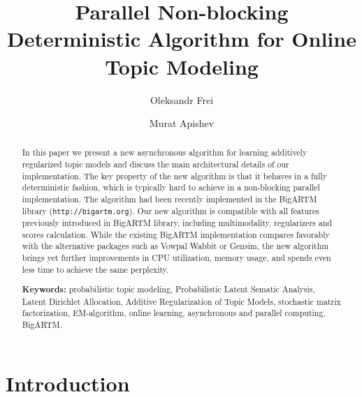 \documentclass[russian,english]{llncs}
\begin{document}
\title{
    Parallel Non-blocking Deterministic Algorithm for Online Topic Modeling
}
\author{
    Oleksandr Frei
    \and
    Murat Apishev
}

\maketitle

\begin{abstract}
In this paper we present a new asynchronous algorithm for learning additively regularized topic models
and discuss the main architectural details of our implementation.
The key property of the new algorithm is that it behaves in a fully deterministic fashion,
which is typically hard to achieve in a non-blocking parallel implementation. The algorithm
had been
recently implemented in the BigARTM library (\texttt{http://bigartm.org}).
Our new algorithm is compatible with all features previously introduced in BigARTM library,
including multimodality, regularizers and scores calculation.
While the existing BigARTM implementation compares favorably
with the alternative packages such as Vowpal Wabbit or Gensim,
the new algorithm brings yet further improvements in CPU utilization,
memory usage, and spends even less time to achieve the same perplexity.

\vspace{1em}
\textbf{Keywords:}
    probabilistic topic modeling,
    Probabilistic Latent Sematic Analysis,
    Latent Dirichlet Allocation,
    Additive Regularization of Topic Models,
    stochastic matrix factorization,
    EM-algorithm,
    online learning,
    asynchronous and parallel computing,
    BigARTM.
\end{abstract}

\section{Introduction}

\end{document}
